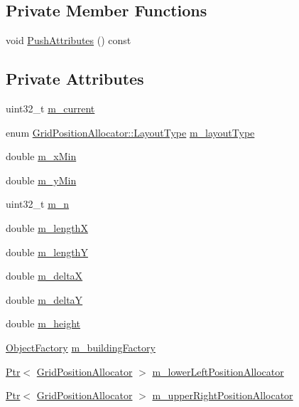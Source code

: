 \subsection*{Private Member Functions}
\begin{DoxyCompactItemize}
\item 
void \hyperlink{classns3_1_1GridBuildingAllocator_a0793f907fd4618a615a6350c2cb1026d}{Push\+Attributes} () const 
\end{DoxyCompactItemize}
\subsection*{Private Attributes}
\begin{DoxyCompactItemize}
\item 
uint32\+\_\+t \hyperlink{classns3_1_1GridBuildingAllocator_adca5c16e0e987a62ea3e9e66267f65e8}{m\+\_\+current}
\item 
enum \hyperlink{classns3_1_1GridPositionAllocator_a31cab553ee810e780d5dce3ed4336b15}{Grid\+Position\+Allocator\+::\+Layout\+Type} \hyperlink{classns3_1_1GridBuildingAllocator_a0cbe2b06ea440c1458353e65af7aa360}{m\+\_\+layout\+Type}
\item 
double \hyperlink{classns3_1_1GridBuildingAllocator_a7bcb4fb2c6e2471ae4a891c0df86e413}{m\+\_\+x\+Min}
\item 
double \hyperlink{classns3_1_1GridBuildingAllocator_a35886beb66427093d15cf0c367879f85}{m\+\_\+y\+Min}
\item 
uint32\+\_\+t \hyperlink{classns3_1_1GridBuildingAllocator_a8ee51ecb7e29bd6a067dfa69dabb00fc}{m\+\_\+n}
\item 
double \hyperlink{classns3_1_1GridBuildingAllocator_abdb168a16e59b4a926e32b7e2324b8f0}{m\+\_\+lengthX}
\item 
double \hyperlink{classns3_1_1GridBuildingAllocator_af0dd03f4a5154a2e1ac8f657d8c70cea}{m\+\_\+lengthY}
\item 
double \hyperlink{classns3_1_1GridBuildingAllocator_a98646154255d263b3aea73237f89dfd7}{m\+\_\+deltaX}
\item 
double \hyperlink{classns3_1_1GridBuildingAllocator_ae664420f09ef3c395c4d93d58741145e}{m\+\_\+deltaY}
\item 
double \hyperlink{classns3_1_1GridBuildingAllocator_aea8e4e327747aa28e8919619dfa4610f}{m\+\_\+height}
\item 
\hyperlink{classns3_1_1ObjectFactory}{Object\+Factory} \hyperlink{classns3_1_1GridBuildingAllocator_a3cc3217b993de3a26a0a342f97f065ca}{m\+\_\+building\+Factory}
\item 
\hyperlink{classns3_1_1Ptr}{Ptr}$<$ \hyperlink{classns3_1_1GridPositionAllocator}{Grid\+Position\+Allocator} $>$ \hyperlink{classns3_1_1GridBuildingAllocator_ab7451cca485f33983ab343594413ecd4}{m\+\_\+lower\+Left\+Position\+Allocator}
\item 
\hyperlink{classns3_1_1Ptr}{Ptr}$<$ \hyperlink{classns3_1_1GridPositionAllocator}{Grid\+Position\+Allocator} $>$ \hyperlink{classns3_1_1GridBuildingAllocator_afaf0278313ca8da37a2164a4428d69c8}{m\+\_\+upper\+Right\+Position\+Allocator}
\end{DoxyCompactItemize}

